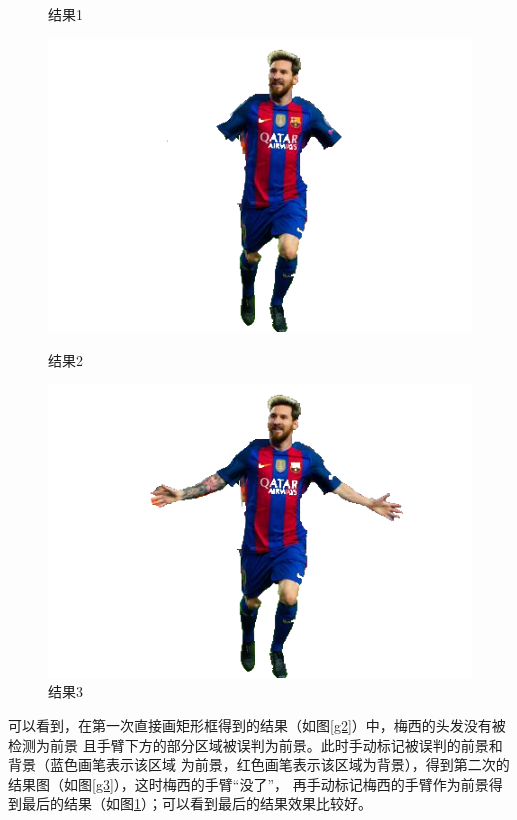 \documentclass[12pt,a4paper]{article}
\begin{document}
\begin{CJK}{UTF8}{gbsn}
\begin{sloppypar}
\begin{figure}[H]
\begin{minipage}{0.49\linewidth}
		\caption{结果1}
		\label{g2}%
	\end{minipage}
	
	\begin{minipage}{0.49\linewidth}
		\centering
		\includegraphics[width=0.9\linewidth]{P1_21.png}
		\caption{结果2}
		\label{g3}%
	\end{minipage}
	\begin{minipage}{0.49\linewidth}
		\centering
		\includegraphics[width=0.9\linewidth]{P1_22.png}
		\caption{结果3}
		\label{g4}%
	\end{minipage}
\end{figure}
可以看到，在第一次直接画矩形框得到的结果（如图\ref{g2}）中，梅西的头发没有被检测为前景
且手臂下方的部分区域被误判为前景。此时手动标记被误判的前景和背景（蓝色画笔表示该区域
为前景，红色画笔表示该区域为背景），得到第二次的结果图（如图\ref{g3}），这时梅西的手臂“没了”，
再手动标记梅西的手臂作为前景得到最后的结果（如图\ref{g4}）；可以看到最后的结果效果比较好。\\

\end{sloppypar}
\end{CJK}
\end{document}
